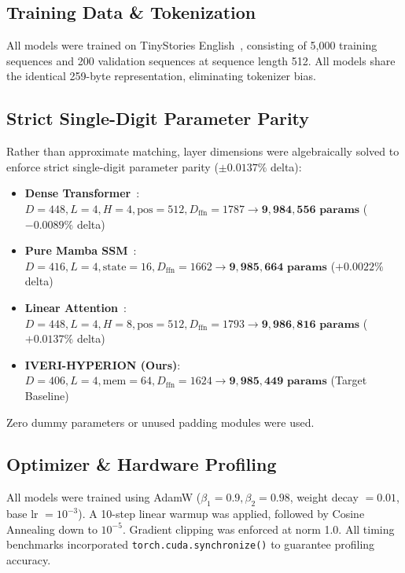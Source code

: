 \documentclass[10pt,twocolumn,letterpaper]{article}
\begin{document}
\subsection{Training Data \& Tokenization}
All models were trained on TinyStories English~\cite{eldan2023tinystories}, consisting of 5,000 training sequences and 200 validation sequences at sequence length 512. All models share the identical 259-byte representation, eliminating tokenizer bias.

\subsection{Strict Single-Digit Parameter Parity}
Rather than approximate matching, layer dimensions were algebraically solved to enforce strict single-digit parameter parity ($\pm 0.0137\%$ delta):
\begin{itemize}[leftmargin=*]
    \item \textbf{Dense Transformer}~\cite{vaswani2017attention}: $D=448, L=4, H=4, \text{pos}=512, D_{\text{ffn}}=1787 \longrightarrow \mathbf{9,984,556\text{ params}}$ ($-0.0089\%$ delta)
    \item \textbf{Pure Mamba SSM}~\cite{gu2023mamba}: $D=416, L=4, \text{state}=16, D_{\text{ffn}}=1662 \longrightarrow \mathbf{9,985,664\text{ params}}$ ($+0.0022\%$ delta)
    \item \textbf{Linear Attention}~\cite{katharopoulos2020transformers}: $D=448, L=4, H=8, \text{pos}=512, D_{\text{ffn}}=1793 \longrightarrow \mathbf{9,986,816\text{ params}}$ ($+0.0137\%$ delta)
    \item \textbf{IVERI-HYPERION (Ours)}: $D=406, L=4, \text{mem}=64, D_{\text{ffn}}=1624 \longrightarrow \mathbf{9,985,449\text{ params}}$ (Target Baseline)
\end{itemize}
Zero dummy parameters or unused padding modules were used.

\subsection{Optimizer \& Hardware Profiling}
All models were trained using AdamW ($\beta_1 = 0.9, \beta_2 = 0.98$, weight decay $= 0.01$, base lr $= 10^{-3}$). A 10-step linear warmup was applied, followed by Cosine Annealing down to $10^{-5}$. Gradient clipping was enforced at norm 1.0. All timing benchmarks incorporated \texttt{torch.cuda.synchronize()} to guarantee profiling accuracy.

\end{document}
